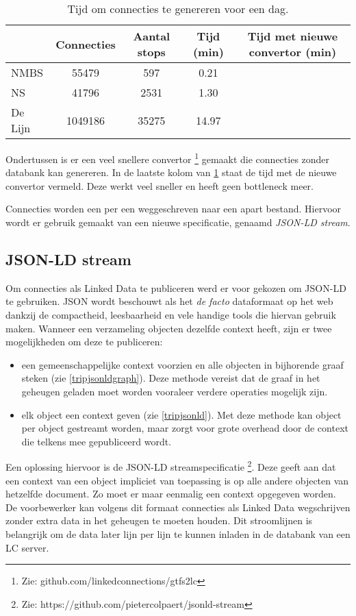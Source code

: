 \begin{table}[htbp]
\centering
\begin{tabular}{ | l || c | c | c | c |}
  \hline			
    & Connecties & Aantal stops & Tijd (min) & Tijd met nieuwe convertor (min) \\ \hline
  NMBS & 55479 & 597 & 0.21 & \\
  NS &  41796 & 2531 & 1.30 & \\
  De Lijn & 1049186 & 35275  & 14.97 & \\
  \hline  
\end{tabular}
\caption{Tijd om connecties te genereren voor een dag.}
\label{table:connectiesgenereren}
\end{table}

Ondertussen is er een veel snellere convertor \footnote{Zie: github.com/linkedconnections/gtfs2lc} gemaakt die connecties zonder databank kan genereren. In de laatste kolom van \ref{table:connectiesgenereren} staat de tijd met de nieuwe convertor vermeld. Deze werkt veel sneller en heeft geen bottleneck meer.

Connecties worden een per een weggeschreven naar een apart bestand. Hiervoor wordt er gebruik gemaakt van een nieuwe specificatie, genaamd \textit{JSON-LD stream}.

\subsection {JSON-LD stream}
\label{jsonldstream}
Om connecties als Linked Data te publiceren werd er voor gekozen om JSON-LD te gebruiken. JSON wordt beschouwt als het \textit{de facto} dataformaat op het web dankzij de compactheid, leesbaarheid en vele handige tools die hiervan gebruik maken. Wanneer een verzameling objecten dezelfde context heeft, zijn er twee mogelijkheden om deze te publiceren:
\begin{itemize}
\item een gemeenschappelijke context voorzien en alle objecten in bijhorende graaf steken (zie \ref{tripjsonldgraph}). Deze methode vereist dat de graaf in het geheugen geladen moet worden vooraleer verdere operaties mogelijk zijn.
\item elk object een context geven (zie \ref{tripjsonld}). Met deze methode kan object per object gestreamt worden, maar zorgt voor grote overhead door de context die telkens mee gepubliceerd wordt.
\end{itemize}
Een oplossing hiervoor is de JSON-LD streamspecificatie \footnote{Zie: https://github.com/pietercolpaert/jsonld-stream}. Deze geeft aan dat een context van een object impliciet van toepassing is op alle andere objecten van hetzelfde document. Zo moet er maar eenmalig een context opgegeven worden.
De voorbewerker kan volgens dit formaat connecties als Linked Data wegschrijven zonder extra data in het geheugen te moeten houden. Dit stroomlijnen is belangrijk om de data later lijn per lijn te kunnen inladen in de databank van een LC server.

